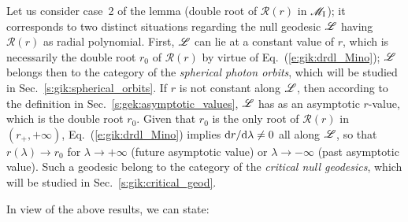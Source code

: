 Let us consider case~2 of the lemma (double root of $\mathcal{R}(r)$ in $\mathscr{M}_{\rm I}$);
it corresponds to two distinct situations regarding the null geodesic $\mathscr{L}$ having
$\mathcal{R}(r)$ as radial polynomial. First, $\mathscr{L}$ can lie at a constant value
of $r$, which is necessarily the double root $r_0$ of $\mathcal{R}(r)$
by virtue of Eq.~(\ref{e:gik:drdl_Mino}); $\mathscr{L}$ belongs then to the category
of the \emph{spherical photon orbits}, which will be
studied in Sec.~\ref{s:gik:spherical_orbits}. If $r$ is not constant along $\mathscr{L}$,
then according to the definition in Sec.~\ref{s:gek:asymptotic_values},
$\mathscr{L}$ has as an asymptotic $r$-value, which is the double root $r_0$.
Given that $r_0$ is the only root of $\mathcal{R}(r)$ in $(r_+,+\infty)$,
Eq.~(\ref{e:gik:drdl_Mino}) implies
$\mathrm{d} r/\mathrm{d}\lambda\neq 0$ all along $\mathscr{L}$, so that $r(\lambda)\to r_0$ for
$\lambda\to+\infty$ (future asymptotic value)
or $\lambda\to-\infty$ (past asymptotic value). Such a geodesic belong to the
category of the \emph{critical null geodesics}, which will be studied in
Sec.~\ref{s:gik:critical_geod}.


In view of the above results, we can state:

